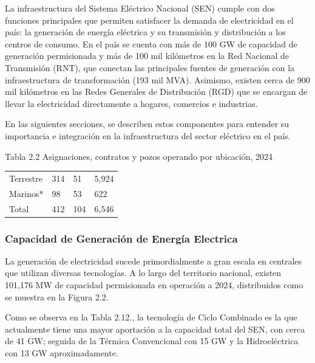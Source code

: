 \documentclass{sener2025}
\begin{document}
La infraestructura del Sistema Eléctrico Nacional (SEN) cumple con dos funciones principales que permiten satisfacer la demanda de electricidad en el país: la generación de energía eléctrica y su transmisión y distribución a los centros de consumo. En el país se cuenta con más de 100 GW de capacidad de generación permisionada y más de 100 mil kilómetros en la Red Nacional de Transmisión (RNT), que conectan las principales fuentes de generación con la infraestructura de transformación (193 mil MVA). Asimismo, existen cerca de 900 mil kilómetros en las Redes Generales de Distribución (RGD) que se encargan de llevar la electricidad directamente a hogares, comercios e industrias.

En las siguientes secciones, se describen estos componentes para entender su importancia e integración en la infraestructura del sector eléctrico en el país.
\begin{tabladoradoCorto}
  \caption{Tabla 2.2 Asignaciones, contratos y pozos operando por ubicación, 2024}
  \label{tab:tabla_2_2_asignaciones__contra}
  \begin{tabularx}{\textwidth}{Vvvv}
    \toprule
      &  &  &  \\
    \midrule
    Terrestre & 314 & 51 & 5,924 \\
    Marinos* & 98 & 53 & 622 \\
    Total & 412 & 104 & 6,546 \\
    \bottomrule
  \end{tabularx}
\end{tabladoradoCorto}
\vspace{-4pt}



\subsubsection{Capacidad de Generación de Energía Electrica}

La generación de electricidad sucede primordialmente a gran escala en centrales que utilizan diversas tecnologías. A lo largo del territorio nacional, existen 101,176 MW de capacidad permisionada en operación a 2024, distribuidos como se muestra en la Figura 2.2.

Como se observa en la Tabla 2.12., la tecnología de Ciclo Combinado es la que actualmente tiene una mayor aportación a la capacidad total del SEN, con cerca de 41 GW; seguida de la Térmica Convencional con 15 GW y la Hidroeléctrica con 13 GW aproximadamente.
\end{document}
